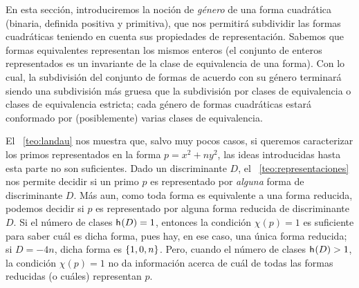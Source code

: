 \theoremstyle{plain}
\newtheorem{teoGeneros}{\teoname}[section]
\newtheorem{coroGeneros}[teoGeneros]{\coroname}
\newtheorem{lemaGeneros}[teoGeneros]{\lemaname}

\theoremstyle{definition}
\newtheorem{defGeneros}[teoGeneros]{}
\newtheorem{ejemGeneros}[teoGeneros]{\ejemname}
\newtheorem{obsGeneros}[teoGeneros]{\obsname}


En esta secci\'on, introduciremos la noci\'on de \emph{g\'enero}
de una forma cuadr\'atica (binaria, definida positiva y primitiva),
que nos permitir\'a subdividir las formas cuadr\'aticas
teniendo en cuenta sus propiedades de representaci\'on.
Sabemos que formas equivalentes representan los mismos enteros
(el conjunto de enteros representados es un invariante de la
clase de equivalencia de una forma).
Con lo cual, la subdivisi\'on del conjunto de formas de acuerdo con su
g\'enero terminar\'a siendo una subdivisi\'on m\'as gruesa que la
subdivisi\'on por clases de equivalencia o clases de equivalencia
estricta; cada g\'enero de formas cuadr\'aticas estar\'a conformado por
(posiblemente) varias clases de equivalencia.

El \teoname~\ref{teo:landau} nos muestra que, salvo muy pocos casos,
si queremos caracterizar los primos representados en la forma
$p=x^2+ny^2$, las ideas introducidas hasta esta parte no son suficientes.
Dado un discriminante $D$, el \teoname~\ref{teo:representaciones} nos
permite decidir si un primo $p$ es representado por \emph{alguna} forma de
discriminante $D$. M\'as aun, como toda forma es equivalente a una forma
reducida, podemos decidir si $p$ es representado por alguna forma reducida
de discriminante $D$.
Si el n\'umero de clases $\mathsf{h}_{}(D)=1$, entonces la condici\'on
$\chi(p)=1$ es suficiente para saber cu\'al es dicha forma, pues hay,
en ese caso, una \'unica forma reducida; si $D=-4n$, dicha forma es
$\left\{1,0,n\right\}$.
Pero, cuando el n\'umero de clases $\mathsf{h}_{}(D)>1$,
la condici\'on $\chi(p)=1$ no da informaci\'on acerca de cu\'al de todas
las formas reducidas (o cu\'ales) representan $p$.

